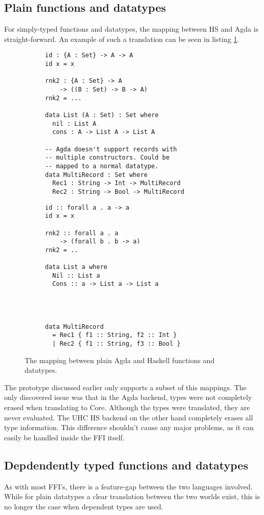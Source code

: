 \documentclass[12pt, a4paper, twoside]{report}
\begin{document}
\subsection{Plain functions and datatypes}
For simply-typed functions and datatypes, the mapping between HS and Agda is straight-forward. An example of such
a translation can be seen in listing \ref{lst:plain-agda-hs}.
\begin{figure}
\begin{subfigure}[b]{0.5\textwidth}
\begin{lstlisting}
id : {A : Set} -> A -> A
id x = x

rnk2 : {A : Set} -> A
    -> ((B : Set) -> B -> A)
rnk2 = ...

data List (A : Set) : Set where
  nil : List A
  cons : A -> List A -> List A

-- Agda doesn't support records with
-- multiple constructors. Could be
-- mapped to a normal datatype.
data MultiRecord : Set where
  Rec1 : String -> Int -> MultiRecord
  Rec2 : String -> Bool -> MultiRecord
\end{lstlisting}
\end{subfigure}
\hspace{10pt}
\begin{subfigure}[b]{0.5\textwidth}
\begin{lstlisting}
id :: forall a . a -> a
id x = x

rnk2 :: forall a . a
    -> (forall b . b -> a)
rnk2 = ..

data List a where
  Nil :: List a
  Cons :: a -> List a -> List a




data MultiRecord
  = Rec1 { f1 :: String, f2 :: Int }
  | Rec2 { f1 :: String, f3 :: Bool }
\end{lstlisting}
\end{subfigure}
\caption{The mapping between plain Agda and Haskell functions and datatypes.}
\label{lst:plain-agda-hs}
\end{figure}

The prototype discussed earlier only supports a subset of this mappings. The only discovered
issue was that in the Agda backend, types were not completely erased when translating to Core.
Although the types were translated, they are never evaluated. The UHC HS backend on the
other hand completely erases all type information. This difference shouldn't cause any major problems,
as it can easily be handled inside the FFI itself.


\subsection{Depdendently typed functions and datatypes}
As with most FFI's, there is a feature-gap between the two languages involved. While for plain datatypes a clear
translation between the two worlds exist, this is no longer the case when dependent types are used.
\end{document}
